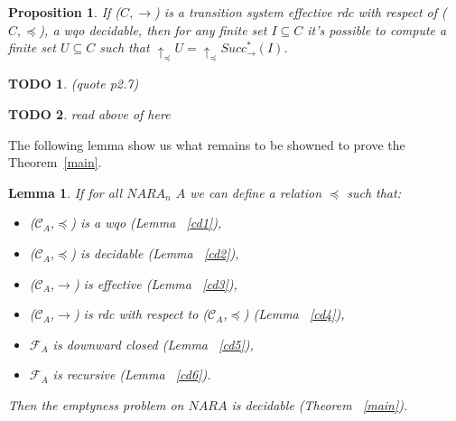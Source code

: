 \documentclass[a4paper,10pt]{report}
\newtheorem{lm}{Lemma}[thr]
\newtheorem{pp}{Proposition}
\newtheorem{td}{TODO}
\newcommand{\C}{\mathcal{C}_{A}}
\newcommand{\F}{\mathcal{F}_{A}}
\begin{document}
\begin{pp} 
  \label{pp}
  If  ($C,\rightarrow$) is a transition system effective rdc with respect of ($C,\preceq$), a wqo decidable, then for any finite set $I\subseteq C$ it's possible to compute a finite set $U \subseteq C$ such that
  $\uparrow_\preceq U=\uparrow_\preceq Succ^*_\rightarrow (I)$.
\end{pp}

\begin{td}
  (quote p2.7)
\end{td}


\begin{td}
  read above of here
\end{td}



The following lemma show us what remains to be showned to prove the Theorem~\ref{main}.
\begin{lm}
    \label{mlm}
    If for all $NARA_n$ $A$ we can define a relation $\preceq$ such that: 
     \begin{itemize}
	\item ($\C$,$\preceq$) is a wqo (Lemma ~\ref{cd1}),
	\item ($\C$,$\preceq$) is decidable (Lemma ~\ref{cd2}),
	\item ($\C$,$\rightarrow$) is effective (Lemma ~\ref{cd3}),
	\item ($\C$,$\rightarrow$) is rdc with respect to ($\C$,$\preceq$) (Lemma ~\ref{cd4}),
	\item $\F$ is downward closed (Lemma ~\ref{cd5}),
	\item $\F$ is recursive (Lemma ~\ref{cd6}).
     \end{itemize}
      Then the emptyness problem on $NARA$ is decidable (Theorem ~\ref{main}).
\end{lm}
\end{document}
